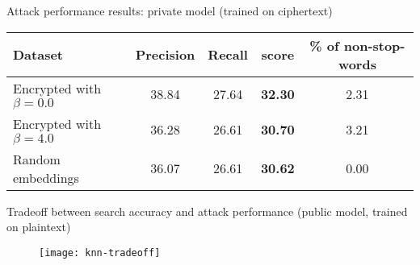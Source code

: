 	\begin{frame}{Attack performance results: private model (trained on ciphertext)}

		\begin{table}[!ht]
			\begin{tabular*}{\linewidth}{ !{\extracolsep\fill} l c c >{\bfseries}c c } %
				\toprule
					Dataset							& Precision		& Recall	& \FOne{} score & \% of non-stop-words	\\
				\midrule
					Encrypted with $\beta = 0.0$	& 38.84			& 27.64		& 32.30			& 2.31					\\
					Encrypted with $\beta = 4.0$	& 36.28			& 26.61		& 30.70			& 3.21					\\
					Random embeddings				& 36.07			& 26.61		& 30.62			& 0.00					\\
				\bottomrule
			\end{tabular*}
		\end{table}

	\end{frame}

	\begin{frame}{Tradeoff between search accuracy and attack performance (public model, trained on plaintext)}

		\begin{figure}[h]
			\centering
			\texttt{[image: knn-tradeoff]}
		\end{figure}

	\end{frame}
